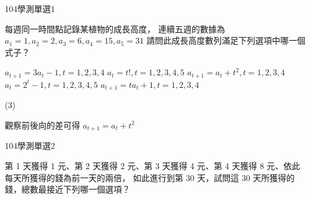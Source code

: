 \begin{QUESTIONS}
    \begin{QUESTION}
        \begin{ExamInfo}{104}{學測}{單選}{1}
        \end{ExamInfo}
        \begin{ExamAnsRateInfo}{88}{99}{98}{67}
        \end{ExamAnsRateInfo}
        \begin{QBODY}
            每週同一時間點記錄某植物的成長高度， 連續五週的數據為
			${{a}_{1}}=1, {{a}_{2}}=2, {{a}_{3}}=6,{{a}_{4}}=15, {{a}_{5}}=31$
			請問此成長高度數列滿足下列選項中哪一個式子？
			\begin{QOPS}
				\QOP ${{a}_{t+1}}=3{{a}_{t}}-1,t=1,2,3,4$
				\QOP ${{a}_{t}}=t!,t=1,2,3,4,5$
				\QOP ${{a}_{t+1}}={{a}_{t}}+{{t}^{2}},t=1,2,3,4$
				\QOP ${{a}_{t}}={{2}^{t}}-1,t=1,2,3,4,5$
				\QOP ${{a}_{t+1}}=t{{a}_{t}}+1,t=1,2,3,4$
			\end{QOPS}
        \end{QBODY}
        \begin{QFROMS}
        \end{QFROMS}
        \begin{QTAGS}\end{QTAGS}
        \begin{QANS}
            (3)
        \end{QANS}
        \begin{QSOLLIST}
            \begin{QSOL}
				觀察前後向的差可得 ${{a}_{t+1}}={{a}_{t}}+{{t}^{2}}$
			\end{QSOL}
        \end{QSOLLIST}
        \begin{QEMPTYSPACE}
        \end{QEMPTYSPACE}
    \end{QUESTION}
    \begin{QUESTION}
        \begin{ExamInfo}{104}{學測}{單選}{2}
        \end{ExamInfo}
        \begin{ExamAnsRateInfo}{68}{88}{72}{44}
        \end{ExamAnsRateInfo}
        \begin{QBODY}
            第 1 天獲得 1 元、第 2 天獲得 2 元、第 3 天獲得 4 元、第 4 天獲得 8 元、依此每天所獲得的錢為前一天的兩倍， 如此進行到第 30 天，試問這 30 天所獲得的錢，總數最接近下列哪一個選項？

\end{QBODY}
\end{QUESTION}
\end{QUESTIONS}
